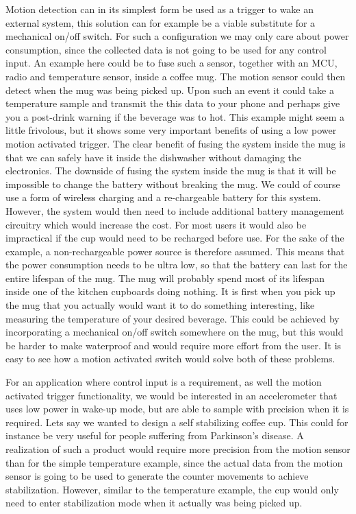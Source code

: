 Motion detection can in its simplest form be used as a trigger to wake an external system, this solution can for example be a viable substitute for a mechanical on/off switch. For such a configuration we may only care about power consumption, since the collected data is not going to be used for any control input. An example here could be to fuse such a sensor, together with an MCU, radio and temperature sensor, inside a coffee mug. The motion sensor could then detect when the mug was being picked up. Upon such an event it could take a temperature sample and transmit the this data to your phone and perhaps give you a post-drink warning if the beverage was to hot. This example might seem a little frivolous, but it shows some very important benefits of using a low power motion activated trigger. The clear benefit of fusing the system inside the mug is that we can safely have it inside the dishwasher without damaging the electronics. The downside of fusing the system inside the mug is that it will be impossible to change the battery without breaking the mug. We could of course use a form of wireless charging and a re-chargeable battery for this system. However, the system would then need to include additional battery management circuitry which would increase the cost. For most users it would also be impractical if the cup would need to be recharged before use. For the sake of the example, a non-rechargeable power source is therefore assumed. This means that the power consumption needs to be ultra low, so that the battery can last for the entire lifespan of the mug. The mug will probably spend most of its lifespan inside one of the kitchen cupboards doing nothing. It is first when you pick up the mug that you actually would want it to do something interesting, like measuring the temperature of your desired beverage. This could be achieved by incorporating a mechanical on/off switch somewhere on the mug, but this would be harder to make waterproof and would require more effort from the user. It is easy to see how a motion activated switch would solve both of these problems. 

For an application where control input is a requirement, as well the motion activated trigger functionality, we would be interested in an accelerometer that uses low power in wake-up mode, but are able to sample with precision when it is required. Lets say we wanted to design a self stabilizing coffee cup. This could for instance be very useful for people suffering from Parkinson's disease. A realization of such a product would require more precision from the motion sensor than for the simple temperature example, since the actual data from the motion sensor is going to be used to generate the counter movements to achieve stabilization. However, similar to the temperature example, the cup would only need to enter stabilization mode when it actually was being picked up.

